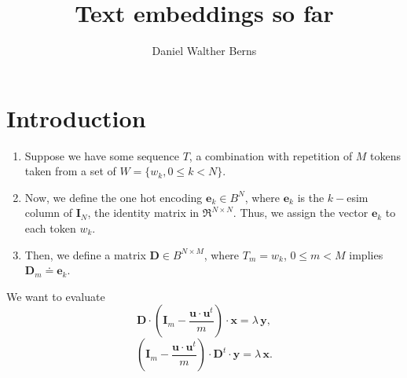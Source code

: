 \documentclass[10pt,a4paper]{article}
\author{Daniel Walther Berns}
\title{Text embeddings so far}
\newcommand\m[1]{\mathbf#1}
\begin{document}
	\section{Introduction}
	\begin{enumerate}
	\item Suppose we have some sequence $T$, a combination with repetition of $M$ tokens taken from a set of $W = \{w_{k}, 0 \leq k < N\}$.
    \item Now, we define the one hot encoding $\m{e}_{k} \in B^{N}$, 
    where $\m{e}_{k}$ is the $k-$esim column of $\m{I}_{N}$, the identity matrix in $\Re^{N \times N}$. Thus, we assign the vector $\m{e}_{k}$ to each token $w_{k}$.
    \item Then, we define a matrix $\m{D} \in B^{N \times M}$, where $T_{m} = w_{k}$, $0 \leq m < M$ implies
    $\m{D}_{m} \doteq \m{e}_{k}$.
    \end{enumerate}
    
    We want to evaluate
    \begin{equation}
    	\m{D} \cdot \left(\m{I}_{m} - \frac{\m{u} \cdot \m{u}^{t}}{m}\right) \cdot \m{x} = \lambda \, \m{y},
    \end{equation}
    \begin{equation}
	\left(\m{I}_{m} - \frac{\m{u} \cdot \m{u}^{t}}{m}\right) \cdot \m{D}^{t} \cdot \m{y} = \lambda \, \m{x}.
\end{equation}
\end{document}
